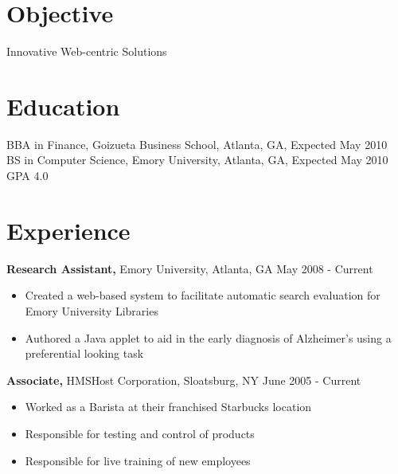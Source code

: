 \documentclass[margin]{res}
\begin{document}
 
 
\hspace{-4cm}  %
 
\address{{\bf Present Address} \\ PO Box 126533 \\ Atlanta, GA 30322  \\
        (845) 222-5529 }
\address{{\bf Permanent Address} \\ 6 Park Avenue \\ Sloatsburg, NY 10974 \\
        (845) 712-5143 }

 
\begin{resume} 
 
\section{Objective} 
Innovative Web-centric Solutions

\section{Education} 
BBA in Finance, Goizueta Business School, Atlanta, GA, Expected May 2010 \\
BS in Computer Science, Emory University, Atlanta, GA, Expected May 2010 \\
GPA 4.0
 

\section{Experience}
 {\bf Research Assistant,} Emory University, Atlanta, GA \hfill May 2008 - Current
 \begin{itemize} \itemsep -2pt  %
 \item Created a web-based system to facilitate automatic search evaluation
                 for Emory University Libraries
 \item Authored a Java applet to aid in the early diagnosis of Alzheimer's
                 using a preferential looking task
 \end{itemize}

 
 
{\bf Associate,} HMSHost Corporation, Sloatsburg, NY \hfill  June 2005 - Current
\begin{itemize} \itemsep -2pt %
\item Worked as a Barista at their franchised Starbucks location 
\item Responsible for testing and control of products
\item Responsible for live training of new employees 
\end{itemize}


\end{resume}
\end{document}
